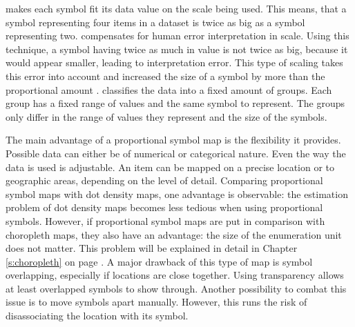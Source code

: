 \begin{enumerate}
 makes each symbol fit its data value on the scale being used. This means, that a symbol representing four items in a dataset is twice as big as a symbol representing two.
 compensates for human error interpretation in scale. Using this technique, a symbol having twice as much in value is not twice as big, because it would appear smaller, leading to interpretation error. This type of scaling takes this error into account and increased the size of a symbol by more than the proportional amount .
 classifies the data into a fixed amount of groups. Each group has a fixed range of values and the same symbol to represent. The groups only differ in the range of values they represent and the size of the symbols.
\end{enumerate}

The main advantage of a proportional symbol map is the flexibility it provides. Possible data can either be of numerical or categorical nature. Even the way the data is used is adjustable. An item can be mapped on a precise location or to geographic areas, depending on the level of detail.
Comparing proportional symbol maps with dot density maps, one advantage is observable: the estimation problem of dot density maps becomes less tedious when using proportional symbols. However, if proportional symbol maps are put in comparison with choropleth maps, they also have an advantage: the size of the enumeration unit does not matter. This problem will be explained in detail in Chapter \ref{s:choropleth} on page \pageref{s:choropleth}.
A major drawback of this type of map is symbol overlapping, especially if locations are close together. Using transparency allows at least overlapped symbols to show through. Another possibility to combat this issue is to move symbols apart manually. However, this runs the risk of disassociating the location with its symbol.